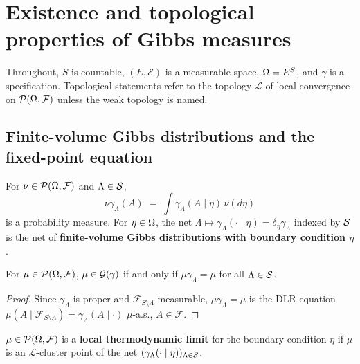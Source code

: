 \section{Existence and topological properties of Gibbs measures}

Throughout, $S$ is countable, $(E,\mathcal E)$ is a measurable space, $\Omega = E^S$, and
$\gamma$ is a specification. Topological statements refer to the topology $\mathcal L$ of
local convergence on $\mathcal{P}(\Omega,\mathcal F)$ unless the weak topology is named.

\subsection*{Finite-volume Gibbs distributions and the fixed-point equation}

\begin{definition}
    \label{def:exg-finite-volume-distribution}
    \leanok

    For $\nu\in\mathcal{P}(\Omega,\mathcal F)$ and $\Lambda\in\mathcal{S}$,
    \[\nu\gamma_\Lambda(A) \;=\; \int \gamma_\Lambda(A\mid\eta)\,\nu(d\eta)\]
    is a probability measure. For $\eta\in\Omega$, the net
    $\Lambda\mapsto\gamma_\Lambda(\cdot\mid\eta) = \delta_\eta\gamma_\Lambda$ indexed by
    $\mathcal{S}$ is the net of \textbf{finite-volume Gibbs distributions with boundary condition
    $\eta$}.
\end{definition}

\begin{lemma}
    \label{lem:exg-mem-gp-iff}
    \leanok

    For $\mu\in\mathcal{P}(\Omega,\mathcal F)$, $\mu\in\mathcal{G}(\gamma)$ if and only if
    $\mu\gamma_\Lambda = \mu$ for all $\Lambda\in\mathcal{S}$.
\end{lemma}
\begin{proof}
    \leanok

    Since $\gamma_\Lambda$ is proper and $\mathcal F_{S\setminus\Lambda}$-measurable,
    $\mu\gamma_\Lambda = \mu$ is the DLR equation
    $\mu(A\mid\mathcal F_{S\setminus\Lambda}) = \gamma_\Lambda(A\mid\cdot)$ $\mu$-a.s.,
    $A\in\mathcal F$.
\end{proof}

\begin{definition}
    \label{def:exg-local-thermo-limit}
    \leanok

    $\mu\in\mathcal{P}(\Omega,\mathcal F)$ is a \textbf{local thermodynamic limit} for the boundary
    condition $\eta$ if $\mu$ is an $\mathcal L$-cluster point of the net
    $(\gamma_\Lambda(\cdot\mid\eta))_{\Lambda\in\mathcal{S}}$.
\end{definition}

